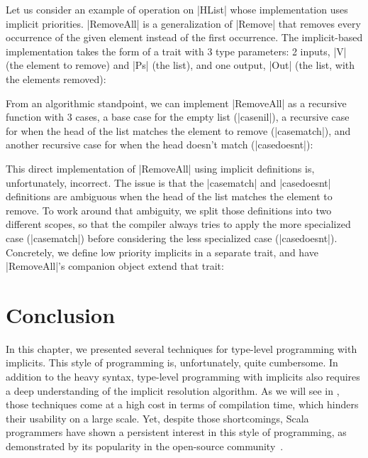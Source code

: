 Let us consider an example of operation on |HList| whose implementation uses implicit priorities.
|RemoveAll| is a generalization of |Remove| that removes every occurrence of the given element instead of the first occurrence.
The implicit-based implementation takes the form of a trait with 3 type parameters: 2 inputs, |V| (the element to remove) and |Ps| (the list), and one output, |Out| (the list, with the elements removed):

\removeAllDefinition

From an algorithmic standpoint, we can implement |RemoveAll| as a recursive function with 3 cases, a base case for the empty list (|casenil|), a recursive case for when the head of the list matches the element to remove (|casematch|), and another recursive case for when the head doesn't match (|casedoesnt|):

\removeAllBroken

This direct implementation of |RemoveAll| using implicit definitions is, unfortunately, incorrect.
The issue is that the |casematch| and |casedoesnt| definitions are ambiguous when the head of the list matches the element to remove.
To work around that ambiguity, we split those definitions into two different scopes, so that the compiler always tries to apply the more specialized case (|casematch|) before considering the less specialized case (|casedoesnt|).
Concretely, we define low priority implicits in a separate trait, and have |RemoveAll|'s companion object extend that trait:

\removeAllPrioritized

\section{Conclusion}

In this chapter, we presented several techniques for type-level programming with implicits.
This style of programming is, unfortunately, quite cumbersome.
In addition to the heavy syntax, type-level programming with implicits also requires a deep understanding of the implicit resolution algorithm.
As we will see in , those techniques come at a high cost in terms of compilation time, which hinders their usability on a large scale.
Yet, despite those shortcomings, Scala programmers have shown a persistent interest in this style of programming, as demonstrated by its popularity in the open-source community~\citep{sabin2011shapeless, pilquist2013scodecs, blanvillain2016frameless}.

